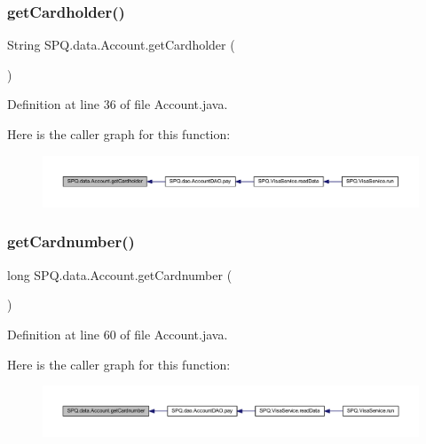 \subsubsection{\texorpdfstring{get\+Cardholder()}{getCardholder()}}
{\footnotesize\ttfamily String S\+P\+Q.\+data.\+Account.\+get\+Cardholder (\begin{DoxyParamCaption}{ }\end{DoxyParamCaption})}



Definition at line 36 of file Account.\+java.

Here is the caller graph for this function\+:
\nopagebreak
\begin{figure}[H]
\begin{center}
\leavevmode
\includegraphics[width=350pt]{class_s_p_q_1_1data_1_1_account_ab4297cf24cbff2975364306a31e75db9_icgraph}
\end{center}
\end{figure}
\mbox{\label{class_s_p_q_1_1data_1_1_account_a54797a8ae92cb43fa9126700579ca9bf}} 
\subsubsection{\texorpdfstring{get\+Cardnumber()}{getCardnumber()}}
{\footnotesize\ttfamily long S\+P\+Q.\+data.\+Account.\+get\+Cardnumber (\begin{DoxyParamCaption}{ }\end{DoxyParamCaption})}



Definition at line 60 of file Account.\+java.

Here is the caller graph for this function\+:
\nopagebreak
\begin{figure}[H]
\begin{center}
\leavevmode
\includegraphics[width=350pt]{class_s_p_q_1_1data_1_1_account_a54797a8ae92cb43fa9126700579ca9bf_icgraph}
\end{center}
\end{figure}
\mbox{\label{class_s_p_q_1_1data_1_1_account_a6f30fcec03cf6e342b7c6d932166ebb1}} 
